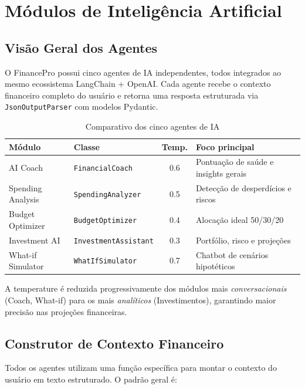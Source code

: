\documentclass[12pt, a4paper, oneside]{report}
\begin{document}
\chapter{Módulos de Inteligência Artificial}

\section{Visão Geral dos Agentes}

O FinancePro possui cinco agentes de IA independentes, todos integrados ao mesmo ecossistema LangChain + OpenAI. Cada agente recebe o contexto financeiro completo do usuário e retorna uma resposta estruturada via \texttt{JsonOutputParser} com modelos Pydantic.

\begin{table}[H]
\centering
\caption{Comparativo dos cinco agentes de IA}
\begin{tabularx}{\textwidth}{l l c X}
\toprule
Módulo & Classe & Temp. & Foco principal \\
\midrule
AI Coach & \texttt{FinancialCoach} & 0.6 & Pontuação de saúde e insights gerais \\
Spending Analysis & \texttt{SpendingAnalyzer} & 0.5 & Detecção de desperdícios e riscos \\
Budget Optimizer & \texttt{BudgetOptimizer} & 0.4 & Alocação ideal 50/30/20 \\
Investment AI & \texttt{InvestmentAssistant} & 0.3 & Portfólio, risco e projeções \\
What-if Simulator & \texttt{WhatIfSimulator} & 0.7 & Chatbot de cenários hipotéticos \\
\bottomrule
\end{tabularx}
\end{table}

\begin{tipbox}
A temperature é reduzida progressivamente dos módulos mais \textit{conversacionais} (Coach, What-if) para os mais \textit{analíticos} (Investimentos), garantindo maior precisão nas projeções financeiras.
\end{tipbox}

\section{Construtor de Contexto Financeiro}

Todos os agentes utilizam uma função específica para montar o contexto do usuário em texto estruturado. O padrão geral é:
\end{document}
